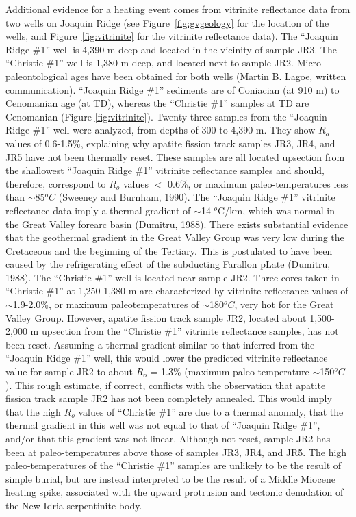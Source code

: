 \documentclass[11pt,twoside]{article}
\begin{document}
Additional  evidence   for  a  heating  event   comes  from  vitrinite
reflectance   data   from   two    wells   on   Joaquin   Ridge   (see
Figure~\ref{fig:gvgeology}  for   the  location  of   the  wells,  and
Figure~\ref{fig:vitrinite} for  the vitrinite reflectance  data).  The
``Joaquin Ridge \#1'' well is 4,390 m deep and located in the vicinity
of sample JR3.  The ``Christie \#1'' well is 1,380 m deep, and located
next to sample JR2.  Micro-paleontological ages have been obtained for
both wells (Martin B.  Lagoe, written communication).  ``Joaquin Ridge
\#1'' sediments are of Coniacian (at 910 m) to Cenomanian age (at TD),
whereas  the ``Christie  \#1'' samples  at TD  are  Cenomanian (Figure
\ref{fig:vitrinite}).  Twenty-three  samples from the  ``Joaquin Ridge
\#1'' well  were analyzed, from depths  of 300 to 4,390  m.  They show
$R_o$  values  of  0.6-1.5\%,  explaining why  apatite  fission  track
samples  JR3, JR4,  and  JR5  have not  been  thermally reset.   These
samples are all located  upsection from the shallowest ``Joaquin Ridge
\#1'' vitrinite reflectance  samples and should, therefore, correspond
to  $R_o$ values $<$  0.6\%, or  maximum paleo-temperatures  less than
$\sim$85$^oC$ (Sweeney and Burnham,  1990).  The ``Joaquin Ridge \#1''
vitrinite  reflectance  data  imply  a thermal  gradient  of  $\sim$14
$^o$C/km, which was normal in the Great Valley forearc basin (Dumitru,
1988).  There exists substantial evidence that the geothermal gradient
in the Great  Valley Group was very low during  the Cretaceous and the
beginning of the Tertiary.  This  is postulated to have been caused by
the refrigerating  effect of  the subducting Farallon  pLate (Dumitru,
1988).  The ``Christie  \#1'' well is located near  sample JR2.  Three
cores taken in ``Christie \#1''  at 1,250-1,380 m are characterized by
vitrinite   reflectance   values   of  $\sim$1.9-2.0\%,   or   maximum
paleotemperatures  of $\sim$180$^oC$,  very hot  for the  Great Valley
Group.   However,  apatite fission  track  sample  JR2, located  about
1,500-2,000   m  upsection   from  the   ``Christie   \#1''  vitrinite
reflectance samples, has not  been reset.  Assuming a thermal gradient
similar to  that inferred  from the ``Joaquin  Ridge \#1''  well, this
would lower  the predicted vitrinite reflectance value  for sample JR2
to  about $R_o$  = 1.3\%  (maximum  paleo-temperature $\sim$150$^oC$).
This rough  estimate, if correct, conflicts with  the observation that
apatite  fission track sample  JR2 has  not been  completely annealed.
This would  imply that the high  $R_o$ values of  ``Christie \#1'' are
due to a  thermal anomaly, that the thermal gradient  in this well was
not equal to that of  ``Joaquin Ridge \#1'', and/or that this gradient
was  not  linear.   Although  not   reset,  sample  JR2  has  been  at
paleo-temperatures above those of samples JR3, JR4, and JR5.  The high
paleo-temperatures of the ``Christie  \#1'' samples are unlikely to be
the result  of simple  burial, but are  instead interpreted to  be the
result of a  Middle  Miocene heating spike, associated  with the upward
protrusion and tectonic denudation of the New Idria serpentinite body.
\end{document}
